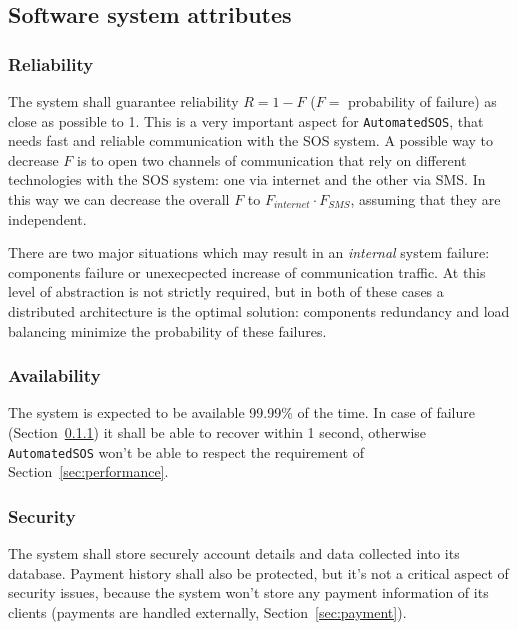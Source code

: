   \subsection{Software system attributes}

    \subsubsection{Reliability}
    \label{sec:reliability}

      The system shall guarantee reliability $R = 1 - F$ ($F =$ probability of failure) as close as possible to 1. This is a very important aspect for \texttt{AutomatedSOS}, that needs fast and reliable communication with the SOS system. A possible way to decrease $F$ is to open two channels of communication that rely on different technologies with the SOS system: one via internet and the other via SMS. In this way we can decrease the overall $F$ to $F_{internet} \cdot F_{SMS}$, assuming that they are independent.

      There are two major situations which may result in an \textit{internal} system failure: components failure or unexecpected increase of communication traffic. At this level of abstraction is not strictly required, but in both of these cases a distributed architecture is the optimal solution: components redundancy and load balancing minimize the probability of these failures.

    \subsubsection{Availability}

      The system is expected to be available 99.99\% of the time. In case of failure (Section~\ref{sec:reliability}) it shall be able to recover within 1 second, otherwise \texttt{AutomatedSOS} won't be able to respect the requirement of Section~\ref{sec:performance}.

    \subsubsection{Security}

      The system shall store securely account details and data collected into its database. Payment history shall also be protected, but it's not a critical aspect of security issues, because the system won't store any payment information of its clients (payments are handled externally, Section~\ref{sec:payment}).

